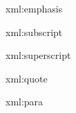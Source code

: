 

\startxmlsetups xml:emphasis
	{\em {}}
\stopxmlsetups

\startxmlsetups xml:subscript
\stopxmlsetups

\startxmlsetups xml:superscript
\stopxmlsetups

\startxmlsetups xml:quote
\stopxmlsetups

\startxmlsetups xml:para
	\par
\stopxmlsetups

